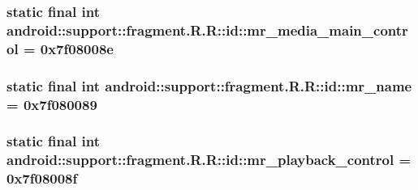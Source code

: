 \hypertarget{classandroid_1_1support_1_1fragment_1_1_r_1_1id_5fa4baa6c3e1104450ba318b93be11ed}{
\subsubsection[{mr\_\-media\_\-main\_\-control}]{\setlength{\rightskip}{0pt plus 5cm}static final int android::support::fragment.R.R::id::mr\_\-media\_\-main\_\-control = 0x7f08008e}}
\label{classandroid_1_1support_1_1fragment_1_1_r_1_1id_5fa4baa6c3e1104450ba318b93be11ed}


\hypertarget{classandroid_1_1support_1_1fragment_1_1_r_1_1id_ba42823119d145932fd7d19cc1ef641f}{
\subsubsection[{mr\_\-name}]{\setlength{\rightskip}{0pt plus 5cm}static final int android::support::fragment.R.R::id::mr\_\-name = 0x7f080089}}
\label{classandroid_1_1support_1_1fragment_1_1_r_1_1id_ba42823119d145932fd7d19cc1ef641f}


\hypertarget{classandroid_1_1support_1_1fragment_1_1_r_1_1id_61d3a08d217a96d2f3557dd337b60b01}{
\subsubsection[{mr\_\-playback\_\-control}]{\setlength{\rightskip}{0pt plus 5cm}static final int android::support::fragment.R.R::id::mr\_\-playback\_\-control = 0x7f08008f}}
\label{classandroid_1_1support_1_1fragment_1_1_r_1_1id_61d3a08d217a96d2f3557dd337b60b01}


